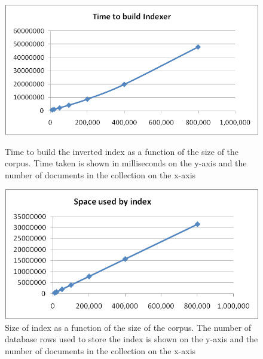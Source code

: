 \documentclass[10pt]{article}
\begin{document}
\begin{figure}[ht]
  \begin{minipage}[b]{0.5\linewidth}
    \centering
    \includegraphics[width=\textwidth]{corpsizetimecomplexbuildindex}
    \caption{Time to build the inverted index as a function of the
      size of the corpus. Time taken is shown in milliseconds on the
      y-axis and the number of documents in the collection on the
      x-axis} 
    \label{fig:corpsizetimecomplexbuildindex}
  \end{minipage}
  \hspace{0.5cm}
  \begin{minipage}[b]{0.5\linewidth}
    \centering
    \includegraphics[width=\textwidth]{corpsizespacecomplexbuildindex}
    \caption{Size of index as a function of the size of the
      corpus. The number of database rows used to store the index is
      shown on the y-axis and the number of documents in the
      collection on the x-axis} 
    \label{fig:corpsizespacecomplexbuildindex}
  \end{minipage}
\end{figure}


\end{document}
